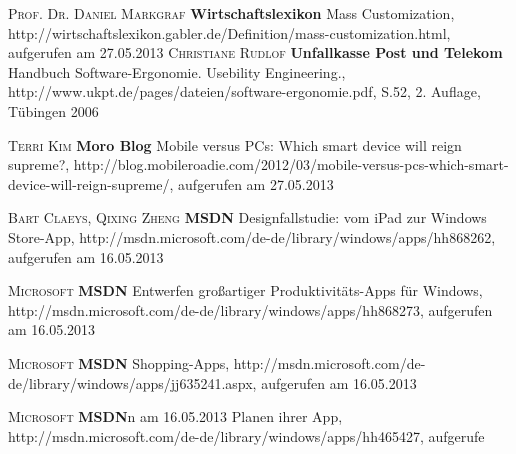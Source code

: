 \begin{thebibliography}{---}

           \textsc{Prof. Dr. Daniel Markgraf }
          \textbf{Wirtschaftslexikon}
          Mass Customization, http://wirtschaftslexikon.gabler.de/Definition/mass-customization.html, aufgerufen am 27.05.2013
           \textsc{Christiane Rudlof}
          \textbf{Unfallkasse Post und Telekom}
          Handbuch Software-Ergonomie. Usebility Engineering., http://www.ukpt.de/pages/dateien/software-ergonomie.pdf, S.52, 2. Auflage, Tübingen 2006

           \textsc{Terri Kim}
          \textbf{Moro Blog}
          Mobile versus PCs: Which smart device will reign supreme?, http://blog.mobileroadie.com/2012/03/mobile-versus-pcs-which-smart-device-will-reign-supreme/, aufgerufen am 27.05.2013

           \textsc{Bart Claeys, Qixing Zheng}
          \textbf{MSDN}
          Designfallstudie: vom iPad zur Windows Store-App, http://msdn.microsoft.com/de-de/library/windows/apps/hh868262, aufgerufen am 16.05.2013
          
            \textsc{Microsoft}
           \textbf{MSDN}
           Entwerfen großartiger Produktivitäts-Apps für Windows, http://msdn.microsoft.com/de-de/library/windows/apps/hh868273, aufgerufen am 16.05.2013
           
              \textsc{Microsoft}
             \textbf{MSDN}
             Shopping-Apps, http://msdn.microsoft.com/de-de/library/windows/apps/jj635241.aspx, aufgerufen am 16.05.2013
             
                \textsc{Microsoft}
               \textbf{MSDN}n am 16.05.2013
 Planen ihrer App, http://msdn.microsoft.com/de-de/library/windows/apps/hh465427, aufgerufe

 
\end{thebibliography}

